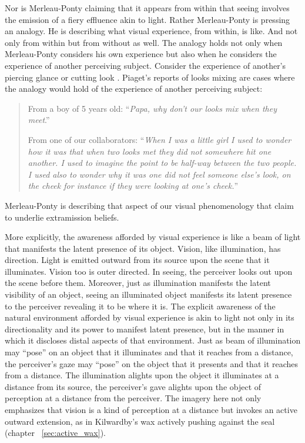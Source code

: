Nor is Merleau-Ponty claiming that it appears from within that seeing involves the emission of a fiery effluence akin to light. Rather Merleau-Ponty is pressing an analogy. He is describing what visual experience, from within, is like. And not only from within but from without as well. The analogy holds not only when Merleau-Ponty considers his own experience but also when he considers the experience of another perceiving subject. Consider the experience of another's piercing glance or cutting look \citep[140]{Winer:1996as}. Piaget's reports of looks mixing are cases where the analogy would hold of the experience of another perceiving subject: 
\begin{quotation}
	From a boy of 5 years old: ``\emph{Papa, why don't our looks mix when they meet}.''
	
	From one of our collaborators: ``\emph{When I was a little girl I used to wonder how it was that when two looks met they did not somewhere hit one another. I used to imagine the point to be half-way between the two people. I used also to wonder why it was one did not feel someone else's look, on the cheek for instance if they were looking at one's cheek.}'' \citep[48]{Piaget:1929dp}
\end{quotation}
Merleau-Ponty is describing that aspect of our visual phenomenology that \citet{Winer:1996as} claim to underlie extramission beliefs. 

More explicitly, the awareness afforded by visual experience is like a beam of light that manifests the latent presence of its object. Vision, like illumination, has direction. Light is emitted outward from its source upon the scene that it illuminates.  Vision too is outer directed. In seeing, the perceiver looks out upon the scene before them. Moreover, just as illumination manifests the latent visibility of an object, seeing an illuminated object manifests its latent presence to the perceiver revealing it to be where it is. The explicit awareness of the natural environment afforded by visual experience is akin to light not only in its directionality and its power to manifest latent presence, but in the manner in which it discloses distal aspects of that environment. Just as beam of illumination may ``pose'' on an object that it illuminates and that it reaches from a distance, the perceiver's gaze may ``pose'' on the object that it presents and that it reaches from a distance. The illumination alights upon the object it illuminates at a distance from its source, the perceiver's gave alights upon the object of perception at a distance from the perceiver. The imagery here not only emphasizes that vision is a kind of perception at a distance but invokes an active outward extension, as in Kilwardby's wax actively pushing against the seal (chapter ~\ref{sec:active_wax}).


